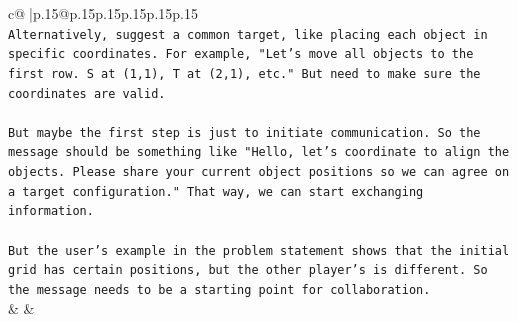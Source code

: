 \documentclass{article}
\begin{document}
{\begin{supertabular}{c@{$\;$}|p{.15\linewidth}@{}p{.15\linewidth}p{.15\linewidth}p{.15\linewidth}p{.15\linewidth}p{.15\linewidth}}
{{{\\ 
\texttt{Alternatively, suggest a common target, like placing each object in specific coordinates. For example, "Let's move all objects to the first row. S at (1,1), T at (2,1), etc." But need to make sure the coordinates are valid.} \\
\\ 
\texttt{But maybe the first step is just to initiate communication. So the message should be something like "Hello, let's coordinate to align the objects. Please share your current object positions so we can agree on a target configuration." That way, we can start exchanging information.} \\
\\ 
\texttt{But the user's example in the problem statement shows that the initial grid has certain positions, but the other player's is different. So the message needs to be a starting point for collaboration.} \\
            }
        }
    }
    & & \\ \\


\end{supertabular}}
\end{document}

